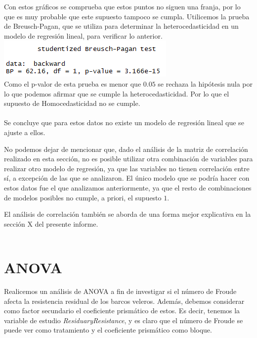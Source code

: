 \documentclass[twoside]{article}
\begin{document}
\begin{multicols}{2}
Con estos gr\'aficos se comprueba que estos puntos no siguen una franja, por lo que es muy probable que este supuesto tampoco se cumpla. Utilicemos la prueba de Breusch-Pagan, que se utiliza para determinar la heterocedasticidad en un modelo de regresi\'on lineal, para verificar lo anterior.\\

\includegraphics[scale=0.6]{images/pic_11.png} \\

Como el p-valor de esta prueba es menor que $0.05$ se rechaza la hip\'otesis nula por lo que  podemos afirmar que se cumple la heterocedasticidad. Por lo que el supuesto de Homocedasticidad no se cumple.\\\\

Se concluye que para estos datos no existe un modelo de regresi\'on lineal que se ajuste a ellos. 

No podemos dejar de mencionar que, dado el an\'alisis de la matriz de correlaci\'on realizado en esta secci\'on, no es posible utilizar otra combinaci\'on de variables para realizar otro modelo de regresi\'on, ya que las variables no tienen correlaci\'on entre s\'i, a excepci\'on de las que se analizaron. El \'unico modelo que se podr\'ia hacer con estos datos fue el que analizamos anteriormente, ya que el resto de combinaciones de modelos posibles no cumple, a priori, el supuesto $1$.

El an\'alisis de correlaci\'on tambi\'en se aborda de una forma mejor explicativa en la secci\'on X del presente informe.\\\\



\section{ANOVA}
Realicemos un an\'alisis de ANOVA a fin de investigar si el n\'umero de Froude afecta la resistencia residual de los barcos veleros. Adem\'as, debemos considerar como factor secundario el coeficiente prism\'atico de estos. Es decir, tenemos la variable de estudio \textit{ResiduaryResistance}, y es claro que el n\'umero de Froude se puede ver como tratamiento y el coeficiente prism\'atico como bloque.


\end{multicols}
\end{document}
